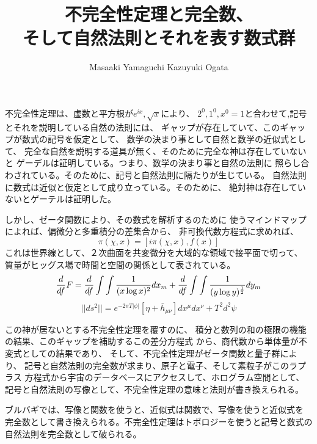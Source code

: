 \documentclass{jsarticle}
\begin{document}
\title{不完全性定理と完全数、\\
そして自然法則とそれを表す数式群}
\author{Masaaki Yamaguchi   Kazuyuki Ogata}
\date{}
\maketitle

  不完全性定理は、虚数と平方根が$ e^{ix},\sqrt{x} $により、
  $ 2^0,1^0,x^0 = 1 $と合わせて,記号とそれを説明している自然の法則には、
  ギャップが存在していて、このギャップが数式の記号を仮定として、
  数学の決まり事として自然と数学の近似式として、
  完全な自然を説明する道具が無く、そのために完全な神は存在していないと
  ゲーデルは証明している。つまり、数学の決まり事と自然の法則に
  照らし合わされている。そのために、記号と自然法則に隔たりが生じている。
  自然法則に数式は近似と仮定として成り立っている。そのために、
  絶対神は存在していないとゲーテルは証明した。 
 
  しかし、ゼータ関数により、その数式を解析するのために
  使うマインドマップによれば、偏微分と多重積分の差集合から、
  非可換代数方程式に求めれば、
  $$ \pi(\chi,x)  = [i \pi(\chi,x),f(x)] $$
  これは世界線として、２次曲面を共変微分を大域的な領域で接平面で切って、
  質量がヒッグス場で時間と空間の関係として表されている。
  $$ {d \over df}F = {d \over df}\int \int{1 \over (x \log x)^2}dx_m
  + {d \over df}\int \int{1 \over (y \log y)^{1 \over 2}}dy_m $$
  $$ ||ds^2|| = e^{-2 \pi T |\phi|}[\eta + \bar{h}_{\mu\nu}]dx^{\mu}
  dx^{\nu} + T^2 d^2 \psi $$

  この神が居ないとする不完全性定理を覆すのに、
  積分と数列の和の極限の機能の結果、このギャップを補助するこの差分方程式
  から、商代数から単体量が不変式としての結果であり、
  そして、不完全性定理がゼータ関数と量子群により、
  記号と自然法則の完全数が求まり、原子と電子、そして素粒子がこのラプラス
  方程式から宇宙のデータベースにアクセスして、ホログラム空間として、
  記号と自然法則の写像として、不完全性定理の意味と法則が書き換えられる。


  ブルバギでは、写像と関数を使うと、近似式は関数で、写像を使うと近似式を
  完全数として書き換えられる。不完全性定理はトポロジーを使うと記号と数式の
  自然法則を完全数として破られる。
\end{document}
